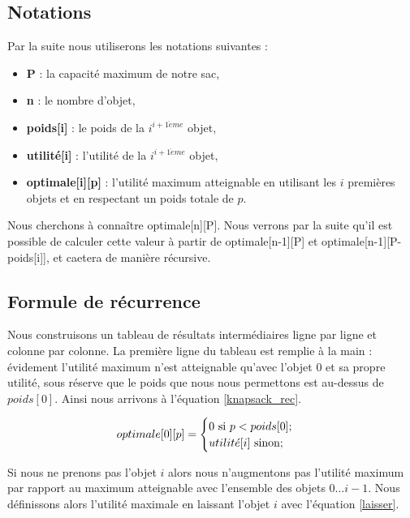 \subsection{Notations}

Par la suite nous utiliserons les notations suivantes :

\begin{itemize}
\item \textbf{P} : la capacité maximum de notre sac,
\item \textbf{n} : le nombre d'objet,
\item \textbf{poids[i]} : le poids de la $i^{i+1\grave{e}me}$ objet,
\item \textbf{utilité[i]} : l'utilité de la $i^{i+1\grave{e}me}$ objet,
\item \textbf{optimale[i][p]} : l'utilité maximum atteignable en utilisant les $i$ premières objets et en respectant un poids totale de $p$.
\end{itemize} 

Nous cherchons à connaître optimale[n][P]. Nous verrons par la suite
qu'il est possible de calculer cette valeur à partir de
optimale[n-1][P] et optimale[n-1][P-poids[i]], et caetera de manière
récursive.

\subsection{Formule de récurrence}
Nous construisons un tableau de résultats intermédiaires ligne par
ligne et colonne par colonne. La première ligne du tableau est remplie
à la main : évidement l'utilité maximum n'est atteignable qu'avec
l'objet $0$ et sa propre utilité, sous réserve que le poids que nous
nous permettons est au-dessus de $poids[0]$. Ainsi nous arrivons à
l'équation \ref{knapsack_rec}.

\begin{equation}
\label{knapsack_rec}
optimale[0][p] =
	\begin{cases}
		0 \text{ si } p < poids[0];	\\
		utilit\acute{e}[i] \text{ sinon};
	\end{cases} \\
\end{equation}

Si nous ne prenons pas l'objet $i$ alors nous n'augmentons pas
l'utilité maximum par rapport au maximum atteignable avec l'ensemble
des objets $0 \dots i-1$. Nous définissons alors l'utilité maximale en
laissant l'objet $i$ avec l'équation \ref{laisser}.

